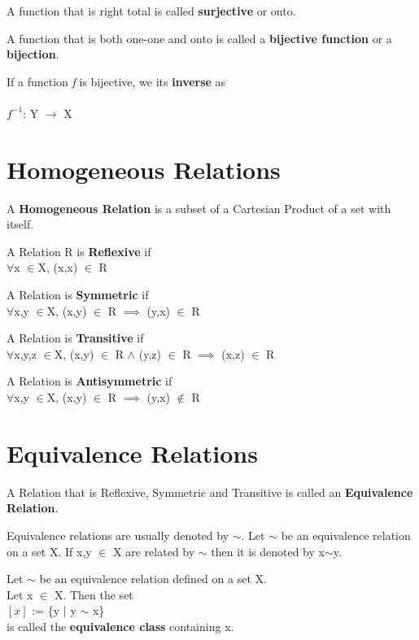 \documentclass{report}
\begin{document}
\begin{definition}
A function that is right total is called \textbf{surjective} or onto.
\end{definition}

\begin{definition}
A function that is both one-one and onto is called a \textbf{bijective function} or a \textbf{bijection}.
\end{definition}
If a function \emph{f} is bijective, we its \textbf{inverse} as\\
\\
$f^{-1}$: Y $\rightarrow$ X\\

\section{Homogeneous Relations}
\begin{definition}
A \textbf{Homogeneous Relation} is a subset of a Cartesian Product of a set with itself.
\end{definition}

\begin{definition}
A Relation R is \textbf{Reflexive} if \\
$\forall$x $\in$X, (x,x) $\in$ R
\end{definition}

\begin{definition}
A Relation is \textbf{Symmetric} if \\
$\forall$x,y $\in$X, (x,y) $\in$ R $\implies$ (y,x) $\in$ R
\end{definition}

\begin{definition}
A Relation is \textbf{Transitive} if \\
$\forall$x,y,z $\in$X, (x,y) $\in$ R $\wedge$ (y,z) $\in$ R $\implies$ (x,z) $\in$ R
\end{definition}

\begin{definition}
A Relation is \textbf{Antisymmetric} if \\
$\forall$x,y $\in$X, (x,y) $\in$ R $\implies$ (y,x) $\notin$ R
\end{definition}


\section{Equivalence Relations}
\begin{definition}
A Relation that is Reflexive, Symmetric and Transitive is called an  \textbf{Equivalence Relation}.
\end{definition}
Equivalence relations are usually denoted by $\sim$.
Let $\sim$ be an equivalence relation on a set X. If x,y $\in$ X are related by  $\sim$ then it is denoted by x$\sim$y.
\begin{definition}
Let $\sim$ be an equivalence relation defined on a set X. \\Let x $\in$ X. Then the set \\
$\left[x\right]$ := \{y $\vert$ y $\sim$ x\} \\ is called the \textbf{equivalence class} containing x.
\end{definition}
\end{document}
